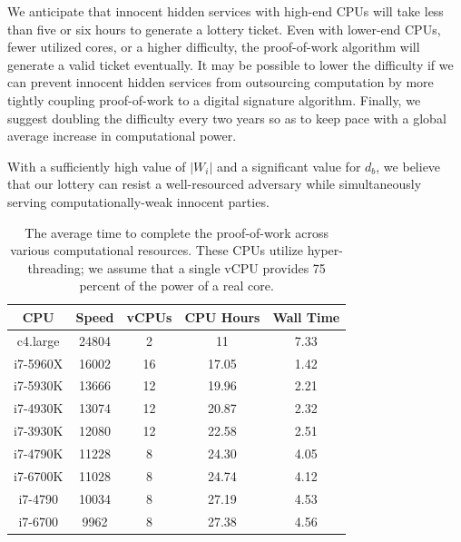 \documentclass[USenglish,oneside,twocolumn]{article}
\newcommand*\nWinners{\left\vert{W_{i}}\right\vert}
\begin{document}

We anticipate that innocent hidden services with high-end CPUs will take less than five or six hours to generate a lottery ticket. Even with lower-end CPUs, fewer utilized cores, or a higher difficulty, the proof-of-work algorithm will generate a valid ticket eventually. It may be possible to lower the difficulty if we can prevent innocent hidden services from outsourcing computation by more tightly coupling proof-of-work to a digital signature algorithm. Finally, we suggest doubling the difficulty every two years so as to keep pace with a global average increase in computational power.

With a sufficiently high value of $ \nWinners $ and a significant value for $ d_{b} $, we believe that our lottery can resist a well-resourced adversary while simultaneously serving computationally-weak innocent parties.

\begin{center}
	\vspace{-5mm}
	\begin{table}[htp]
		\hspace{5 mm}
  		\begin{tabular}{ | c | c | c | c | c | }
  		\textbf{CPU} & \textbf{Speed} & \textbf{vCPUs} & \textbf{CPU Hours} & \textbf{Wall Time} \\ \hline
  		c4.large & 24804 & 2 & 11 & 7.33 \\ \hline
  		i7-5960X	 & 16002 & 16 & 17.05 & 1.42 \\ \hline
  		i7-5930K & 13666 & 12 & 19.96 & 2.21 \\ \hline
  		i7-4930K & 13074 & 12 & 20.87 & 2.32 \\ \hline
  		i7-3930K & 12080 & 12 & 22.58 & 2.51 \\ \hline
  		i7-4790K & 11228 & 8 & 24.30 & 4.05 \\ \hline
  		i7-6700K & 11028 & 8 & 24.74 & 4.12 \\ \hline
  		i7-4790 & 10034 & 8 & 27.19 & 4.53 \\ \hline
  		i7-6700 & 9962 & 8 & 27.38 & 4.56 \\
		\end{tabular}
		\caption{The average time to complete the proof-of-work across various computational resources. These CPUs utilize hyper-threading; we assume that a single vCPU provides 75 percent of the power of a real core.}
		\label{table:PoWtime}
	\end{table}
	\vspace{-10mm}
\end{center}
\end{document}
